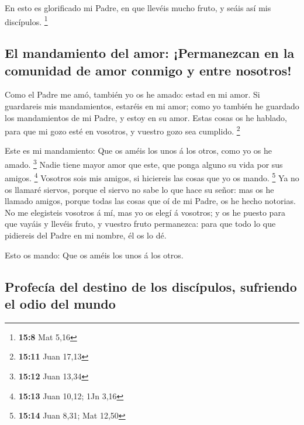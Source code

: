  En esto es glorificado mi Padre, en que llevéis mucho
fruto, y seáis así mis discípulos. \footnote{\textbf{15:8} Mat 5,16}

\hypertarget{el-mandamiento-del-amor-permanezcan-en-la-comunidad-de-amor-conmigo-y-entre-nosotros}{%
\subsection{El mandamiento del amor: ¡Permanezcan en la comunidad de
amor conmigo y entre
nosotros!}\label{el-mandamiento-del-amor-permanezcan-en-la-comunidad-de-amor-conmigo-y-entre-nosotros}}

 Como el Padre me amó, también yo os he amado: estad en mi
amor.  Si guardareis mis mandamientos, estaréis en mi
amor; como yo también he guardado los mandamientos de mi Padre, y estoy
en su amor.  Estas cosas os he hablado, para que mi gozo
esté en vosotros, y vuestro gozo sea cumplido. \footnote{\textbf{15:11}
  Juan 17,13}

 Este es mi mandamiento: Que os améis los unos á los
otros, como yo os he amado. \footnote{\textbf{15:12} Juan 13,34}
 Nadie tiene mayor amor que este, que ponga alguno su
vida por sus amigos. \footnote{\textbf{15:13} Juan 10,12; 1Jn 3,16}
 Vosotros sois mis amigos, si hiciereis las cosas que yo
os mando. \footnote{\textbf{15:14} Juan 8,31; Mat 12,50} 
Ya no os llamaré siervos, porque el siervo no sabe lo que hace su señor:
mas os he llamado amigos, porque todas las cosas que oí de mi Padre, os
he hecho notorias.  No me elegisteis vosotros á mí, mas
yo os elegí á vosotros; y os he puesto para que vayáis y llevéis fruto,
y vuestro fruto permanezca: para que todo lo que pidiereis del Padre en
mi nombre, él os lo dé.

 Esto os mando: Que os améis los unos á los otros.

\hypertarget{profecuxeda-del-destino-de-los-discuxedpulos-sufriendo-el-odio-del-mundo}{%
\subsection{Profecía del destino de los discípulos, sufriendo el odio
del
mundo}\label{profecuxeda-del-destino-de-los-discuxedpulos-sufriendo-el-odio-del-mundo}}


